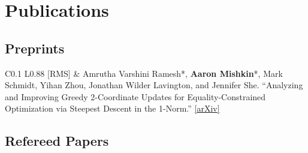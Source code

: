 \documentclass[10pt]{article}
\newcommand{\spacing}{\vspace{0.5cm}}
\begin{document}
\spacing

\section{Publications}

\vspace{1em}

\subsection*{Preprints}

\begin{longtable}{C{0.1\linewidth} L{0.88\linewidth}}
    [RMS] &
    Amrutha Varshini Ramesh*, \textbf{Aaron Mishkin}*, Mark Schmidt, Yihan
    Zhou, Jonathan Wilder Lavington, and Jennifer She.  ``Analyzing and
    Improving Greedy 2-Coordinate Updates for Equality-Constrained Optimization
    via Steepest Descent in the 1-Norm.''
    \href{https://arxiv.org/abs/2307.01169}{[arXiv]} \\
\end{longtable}

\newpage

\subsection*{Refereed Papers}
\end{document}
